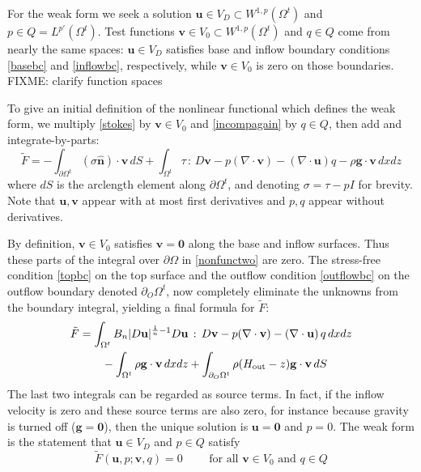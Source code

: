 \documentclass[letterpaper,final,12pt,reqno]{amsart}
\newcommand{\hbn}{\hat{\mathbf{n}}}
\newcommand{\bg}{\mathbf{g}}
\newcommand{\bu}{\mathbf{u}}
\newcommand{\bv}{\mathbf{v}}
\newcommand{\bzero}{\bm{0}}
\begin{document}
For the weak form we seek a solution $\bu\in V_D \subset W^{1,p}(\Omega^t)$ and $p \in Q=L^{p'}(\Omega^t)$.  Test functions $\bv\in V_0 \subset W^{1,p}(\Omega^t)$ and $q\in Q$ come from nearly the same spaces: $\bu\in V_D$ satisfies base and inflow boundary conditions \eqref{basebc} and \eqref{inflowbc}, respectively, while $\bv\in V_0$ is zero on those boundaries.  FIXME: clarify function spaces

To give an initial definition of the nonlinear functional which defines the weak form, we multiply \eqref{stokes} by $\bv\in V_0$ and \eqref{incompagain} by $q\in Q$, then add and integrate-by-parts:
\begin{equation}
\tilde F = -\int_{\partial\Omega^t} (\sigma \hbn)\cdot \bv\,dS + \int_{\Omega^t} \tau \,:\,D\bv - p (\nabla \cdot \bv) - \left(\nabla \cdot \bu\right) q - \rho \mathbf{g} \cdot \bv \,dx dz \label{nonfunctwo}
\end{equation}
where $dS$ is the arclength element along $\partial\Omega^t$, and denoting $\sigma=\tau-pI$ for brevity.  Note that $\bu,\bv$ appear with at most first derivatives and $p,q$ appear without derivatives.

By definition, $\bv\in V_0$ satisfies $\bv=\bzero$ along the base and inflow surfaces.  Thus these parts of the integral over $\partial\Omega$ in \eqref{nonfunctwo} are zero.  The stress-free condition \eqref{topbc} on the top surface and the outflow condition \eqref{outflowbc} on the outflow boundary denoted $\partial_O \Omega^t$, now completely eliminate the unknowns from the boundary integral, yielding a final formula for $\tilde F$:
\begin{align}
\tilde F &= \int_{\Omega^t} B_n |D\bu|^{\frac{1}{n} - 1} D\bu\,:\,D\bv - p (\nabla \cdot \bv) - \left(\nabla \cdot \bu\right) q \,dx dz \label{definetildeF} \\
    &\qquad  - \int_{\Omega^t} \rho \mathbf{g} \cdot \bv \,dx dz + \int_{\partial_O \Omega^t} \rho (H_{\text{out}}-z) \bg \cdot \bv \,dS \notag
\end{align}
The last two integrals can be regarded as source terms.  In fact, if the inflow velocity is zero and these source terms are also zero, for instance because gravity is turned off ($\bg=\bzero$), then the unique solution is $\bu=\bzero$ and $p=0$.  The weak form is the statement that $\bu\in V_D$ and $p\in Q$ satisfy
\begin{equation}
\tilde F(\bu,p;\bv,q) = 0 \qquad \text{ for all } \bv\in V_0 \text{ and } q\in Q  \label{weak}
\end{equation}
\end{document}
